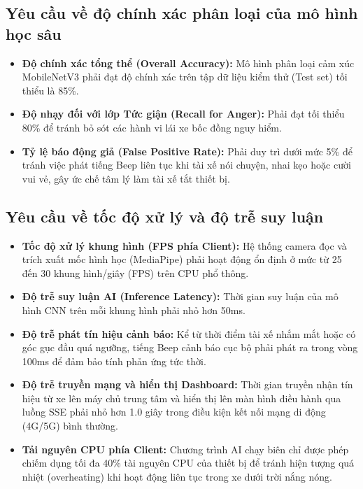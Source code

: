 \documentclass[../DoAn.tex]{subfiles}
\begin{document}
\subsection{Yêu cầu về độ chính xác phân loại của mô hình học sâu}
\begin{itemize}
    \item \textbf{Độ chính xác tổng thể (Overall Accuracy):} Mô hình phân loại cảm xúc MobileNetV3 phải đạt độ chính xác trên tập dữ liệu kiểm thử (Test set) tối thiểu là 85\%.
    \item \textbf{Độ nhạy đối với lớp Tức giận (Recall for Anger):} Phải đạt tối thiểu 80\% để tránh bỏ sót các hành vi lái xe bốc đồng nguy hiểm.
    \item \textbf{Tỷ lệ báo động giả (False Positive Rate):} Phải duy trì dưới mức 5\% để tránh việc phát tiếng Beep liên tục khi tài xế nói chuyện, nhai kẹo hoặc cười vui vẻ, gây ức chế tâm lý làm tài xế tắt thiết bị.
\end{itemize}

\subsection{Yêu cầu về tốc độ xử lý và độ trễ suy luận}
\begin{itemize}
    \item \textbf{Tốc độ xử lý khung hình (FPS phía Client):} Hệ thống camera đọc và trích xuất mốc hình học (MediaPipe) phải hoạt động ổn định ở mức từ 25 đến 30 khung hình/giây (FPS) trên CPU phổ thông.
    \item \textbf{Độ trễ suy luận AI (Inference Latency):} Thời gian suy luận của mô hình CNN trên mỗi khung hình phải nhỏ hơn 50ms.
    \item \textbf{Độ trễ phát tín hiệu cảnh báo:} Kể từ thời điểm tài xế nhắm mắt hoặc có góc gục đầu quá ngưỡng, tiếng Beep cảnh báo cục bộ phải phát ra trong vòng 100ms để đảm bảo tính phản ứng tức thời.
    \item \textbf{Độ trễ truyền mạng và hiển thị Dashboard:} Thời gian truyền nhận tín hiệu từ xe lên máy chủ trung tâm và hiển thị lên màn hình điều hành qua luồng SSE phải nhỏ hơn 1.0 giây trong điều kiện kết nối mạng di động (4G/5G) bình thường.
    \item \textbf{Tải nguyên CPU phía Client:} Chương trình AI chạy biên chỉ được phép chiếm dụng tối đa 40\% tài nguyên CPU của thiết bị để tránh hiện tượng quá nhiệt (overheating) khi hoạt động liên tục trong xe dưới trời nắng nóng.
\end{itemize}
\end{document}
